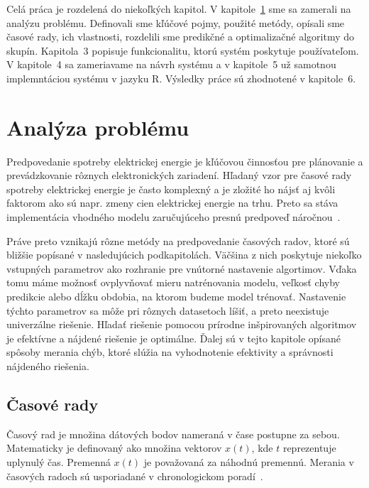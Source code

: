 \documentclass[a4paper,slovak,12pt,appendix]{article}
\begin{document}
Celá práca je rozdelená do niekoľkých kapitol. V
kapitole~\ref{problem-analysis} sme sa zamerali na analýzu problému. Definovali
sme kľúčové pojmy, použité metódy, opísali sme časové rady, ich vlastnosti,
rozdelili sme predikčné a optimalizačné algoritmy do skupín.
Kapitola~3 popisuje funkcionalitu, ktorú systém poskytuje                       %
používateľom. V kapitole~4 sa zameriavame na návrh systému                      %
a v kapitole~5 už samotnou implemntáciou systému v jazyku R.                    %
Výsledky práce sú zhodnotené v kapitole~6.                                      %


\newpage
\section{Analýza problému}
\label{problem-analysis}
Predpovedanie spotreby elektrickej energie je kľúčovou činnosťou pre plánovanie
a prevádzkovanie rôznych elektronických zariadení. Hľadaný vzor pre časové
rady spotreby elektrickej energie je často komplexný a je zložité ho nájsť aj
kvôli faktorom ako sú napr. zmeny cien elektrickej energie na trhu. Preto sa
stáva implementácia vhodného modelu zaručujúceho presnú predpoveď
náročnou~\cite{Mahalakshmi2016}.

Práve preto vznikajú rôzne metódy na predpovedanie časových radov, ktoré sú
bližšie popísané v nasledujúcich podkapitolách. Väčšina z nich poskytuje
niekoľko vstupných parametrov ako rozhranie pre vnútorné nastavenie algortimov.
Vďaka tomu máme možnosť ovplyvňovať mieru natrénovania modelu, veľkosť chyby
predikcie alebo dĺžku obdobia, na ktorom budeme model trénovať. Nastavenie
týchto parametrov sa môže pri rôznych datasetoch líšiť, a preto neexistuje
univerzálne riešenie. Hľadať riešenie pomocou prírodne inšpirovaných
algoritmov je efektívne a nájdené riešenie je optimálne. Ďalej sú v tejto
kapitole opísané spôsoby merania chýb, ktoré slúžia na vyhodnotenie efektivity
a správnosti nájdeného riešenia.


\subsection{Časové rady}
Časový rad je množina dátových bodov nameraná v čase postupne za sebou.
Matematicky je definovaný ako množina vektorov $x(t)$, kde $t$ reprezentuje
uplynulý čas. Premenná $x(t)$ je považovaná za náhodnú premennú.
Merania v časových radoch sú usporiadané v chronologickom
poradí~\cite{Agrawal2013}.
\end{document}
